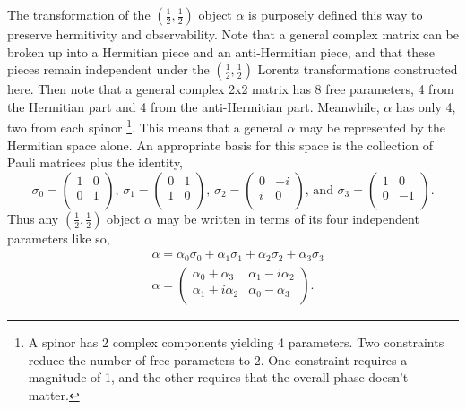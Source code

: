 The transformation of the $(\frac{1}{2}, \frac{1}{2})$ object $\alpha$ is purposely defined this way to preserve hermitivity and observability. Note that a general complex matrix can be broken up into a Hermitian piece and an anti-Hermitian piece, and that these pieces remain independent under the $(\frac{1}{2}, \frac{1}{2})$ Lorentz transformations constructed here. Then note that a general complex 2x2 matrix has 8 free parameters, 4 from the Hermitian part and 4 from the anti-Hermitian part. Meanwhile, $\alpha$ has only 4, two from each spinor \footnote{A spinor has 2 complex components yielding 4 parameters. Two constraints reduce the number of free parameters to 2. One constraint requires a magnitude of 1, and the other requires that the overall phase doesn't matter.}. This means that a general $\alpha$ may be represented by the Hermitian space alone. An appropriate basis for this space is the collection of Pauli matrices plus the identity,
\begin{equation}
\sigma_0 =  
\begin{pmatrix}
1 & 0 \\
0 & 1 \\
\end{pmatrix}\text{, }
\sigma_1 =  
\begin{pmatrix}
0 & 1 \\
1 & 0 \\
\end{pmatrix}\text{, }
\sigma_2 = 
\begin{pmatrix}
0 & -i \\
i & 0 \\
\end{pmatrix}\text{, and }
\sigma_3 = 
\begin{pmatrix}
1 & 0 \\
0 & -1 \\
\end{pmatrix}.
\end{equation}
Thus any $(\frac{1}{2}, \frac{1}{2})$ object $\alpha$ may be written in terms of its four independent parameters like so, 
\begin{equation}
\begin{split}
&\alpha = \alpha_0 \sigma_0 + \alpha_1 \sigma_1 + \alpha_2 \sigma_2 + \alpha_3 \sigma_3 \\
&\alpha = 
\begin{pmatrix}
\alpha_0 + \alpha_3 & \alpha_1 - i\alpha_2 \\
\alpha_1 + i\alpha_2 & \alpha_0 - \alpha_3 \\
\end{pmatrix}.
\end{split}
\end{equation}

